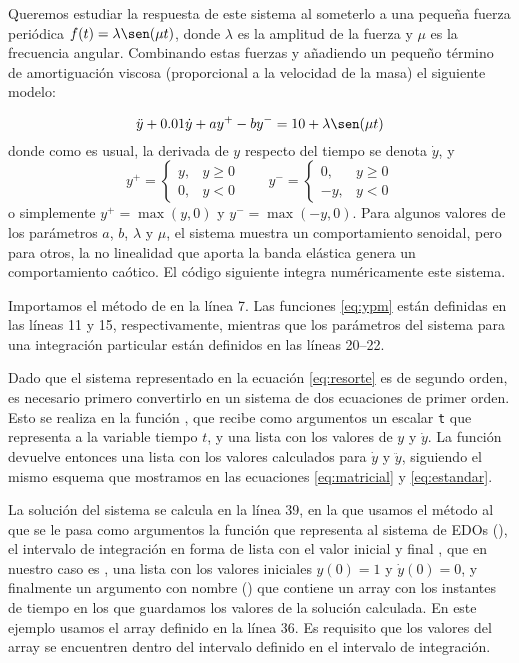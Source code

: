  Queremos estudiar la respuesta de este sistema al someterlo a una pequeña fuerza periódica $f(t) = \lambda \sen(\mu t)$, donde $\lambda$ es la amplitud de la fuerza y $\mu$ es la frecuencia angular. Combinando estas fuerzas y añadiendo un pequeño término de amortiguación viscosa (proporcional a la velocidad de la masa) el siguiente modelo:
 
 \begin{equation}\label{eq:resorte}
  \ddot{y} + 0.01 \dot{y} + a y^+ - b y^- = 10 + \lambda \sen(\mu t)
 \end{equation} 
 donde como es usual, la derivada de $y$ respecto del tiempo se denota $\dot{y}$, y 
 \begin{equation}\label{eq:ypm}
  y^+ = 
  \begin{cases}
   y,  & y \geq 0 \\
   0,  & y < 0
  \end{cases}
  \hspace{2em}
  y^- = 
  \begin{cases}
   0,  & y \geq 0 \\
   -y, & y < 0
  \end{cases}
 \end{equation} 
 o simplemente $ y^+ = \max(y, 0)$ y $y^- = \max(-y, 0)$.  Para algunos valores de los parámetros $a$, $b$, $\lambda$ y $\mu$, el sistema muestra un comportamiento senoidal, pero para otros, la no linealidad que aporta la banda elástica genera un comportamiento caótico. El código siguiente integra numéricamente este sistema.
 
 Importamos el método  de  en la línea 7. Las funciones \ref{eq:ypm} están definidas en las líneas 11 y 15, respectivamente, mientras que los parámetros del sistema para una integración particular están definidos en las líneas 20--22. 
 
 Dado que el sistema representado en la ecuación \ref{eq:resorte} es de segundo orden, es necesario primero convertirlo en un sistema de dos ecuaciones de primer orden. Esto se realiza en la función , que recibe como argumentos un escalar \verb|t| que representa a la variable tiempo $t$, y una lista con los valores de $y$ y $\dot{y}$. La función devuelve entonces una lista con los valores calculados para $\dot{y}$ y $\ddot{y}$, siguiendo el mismo esquema que mostramos en las ecuaciones \ref{eq:matricial} y \ref{eq:estandar}.
 
 La solución del sistema se calcula en la línea 39, en la que usamos el método  al que se le pasa como argumentos la función que representa al sistema de EDOs (), el intervalo de integración en forma de lista con el valor inicial y final \mip{[t0, tf]}, que en nuestro caso es \mip{[0, 100]}, una lista con los valores iniciales $y(0) = 1$ y $\dot{y}(0) = 0$, y finalmente un argumento con nombre () que contiene un array con los instantes de tiempo en los que guardamos los valores de la solución calculada. En este ejemplo usamos el array definido en la línea 36. Es requisito que los valores del array se encuentren dentro del intervalo definido en el intervalo de integración.
 
